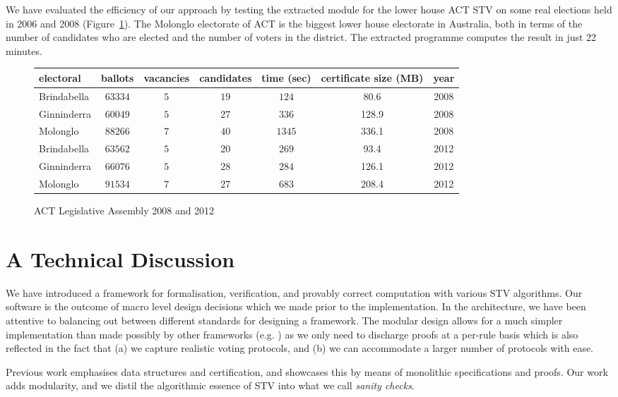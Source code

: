 \documentclass{llncs}
\begin{document}
 
 We have evaluated the efficiency of our approach by testing the
 extracted module for the lower house ACT STV on some real elections
 held in 2006 and 2008 (Figure~\ref{ref;figure6}). The Molonglo
 electorate of ACT is the biggest lower house electorate in
 Australia, both in terms of the number of candidates who are
 elected and the number of voters in the district. The extracted
 programme computes the result in just 22 minutes.  \begin{small}
\begin{figure}[b]
\centering
\begin{tabular}{|l |c |c |c |c |c|c|}
\hline
electoral & ballots& vacancies& candidates& time (sec)& certificate size (MB)&year\\
\hline
Brindabella &$63334$&$5$&$19$&$124$&80.6&2008\\
Ginninderra &$60049$&$5$&$27$&$336$&128.9&2008\\
Molonglo &$88266$&$7$&$40$&$1345$&336.1&2008\\
Brindabella&$63562$&$5$&$20$&$269$&93.4&2012\\
Ginninderra&$66076$&$5$&$28$&$284$&126.1&2012\\
Molonglo&$91534$&$7$&$27$&$683$&208.4&2012\\
\hline
\end{tabular}
\caption{ACT Legislative Assembly 2008 and 2012}
\label{ref;figure6}
\end{figure}
\end{small}  
\section{A Technical Discussion}
We have introduced a framework for formalisation, verification, and
provably correct computation with various STV algorithms. Our
software is the outcome of macro level design decisions which we
made prior to the implementation. In the architecture, we have been
attentive to  balancing out between different standards for
designing a framework. The modular design allows for a much simpler
implementation than made possibly by other frameworks (e.g.
\cite{Ghale:2017:FVS}) as we only need to discharge proofs at a
per-rule basis which is also reflected in the fact that (a) we
capture realistic voting protocols, and (b) we can accommodate a
larger number of protocols with ease.
  

Previous work emphasises data structures and certification, and
showcases this by means of monolithic specifications and proofs. Our
work adds modularity,  and we distil the algorithmic essence of STV
into what we call \emph{sanity checks}.
\end{document}
